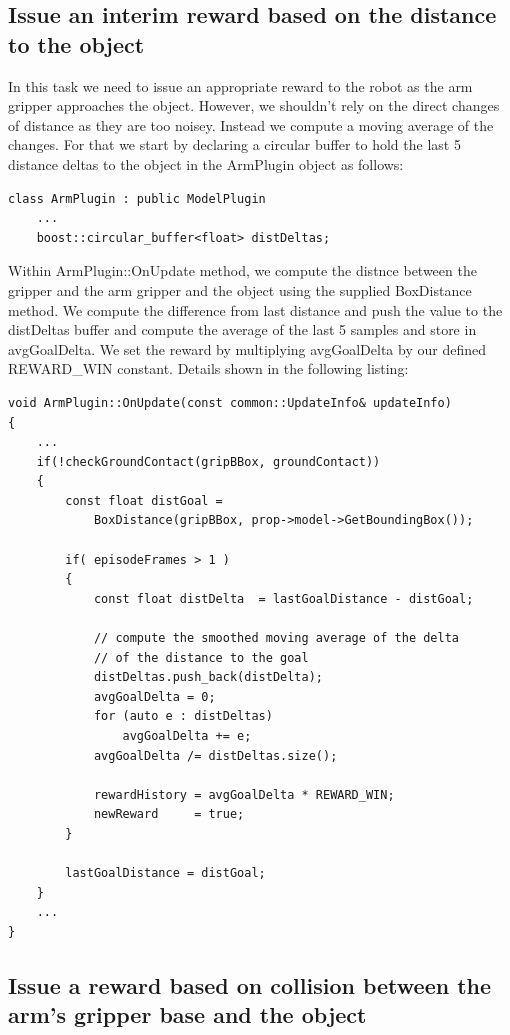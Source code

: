 \documentclass{article}
\begin{document}
\subsection{Issue an interim reward based on the distance to the object}
In this task we need to issue an appropriate reward to the robot as the arm gripper approaches the object. However, we shouldn't rely on the direct changes of distance as they are too noisey. Instead we compute a moving average of the changes. For that we start by declaring a circular buffer to hold the last 5 distance deltas to the object in the ArmPlugin object as follows:
\begin{lstlisting}
class ArmPlugin : public ModelPlugin
    ...
    boost::circular_buffer<float> distDeltas;
\end{lstlisting}

Within ArmPlugin::OnUpdate method, we compute the distnce between the gripper and the arm gripper and the object using the supplied BoxDistance method. We compute the difference from last distance and push the value to the distDeltas buffer and compute the average of the last 5 samples and store in avgGoalDelta. We set the reward by multiplying avgGoalDelta by our defined REWARD\_WIN constant. Details shown in the following listing:

\begin{lstlisting}
void ArmPlugin::OnUpdate(const common::UpdateInfo& updateInfo)
{
	...
    if(!checkGroundContact(gripBBox, groundContact))
    {
        const float distGoal =
            BoxDistance(gripBBox, prop->model->GetBoundingBox());

        if( episodeFrames > 1 )
        {
            const float distDelta  = lastGoalDistance - distGoal;
			
            // compute the smoothed moving average of the delta
            // of the distance to the goal
            distDeltas.push_back(distDelta);
            avgGoalDelta = 0;
            for (auto e : distDeltas)
                avgGoalDelta += e;
            avgGoalDelta /= distDeltas.size();
			
            rewardHistory = avgGoalDelta * REWARD_WIN;
            newReward     = true;
        }

        lastGoalDistance = distGoal;
    }
	...
}
\end{lstlisting}

\subsection{Issue a reward based on collision between the arm’s gripper base and the object}
\end{document}
